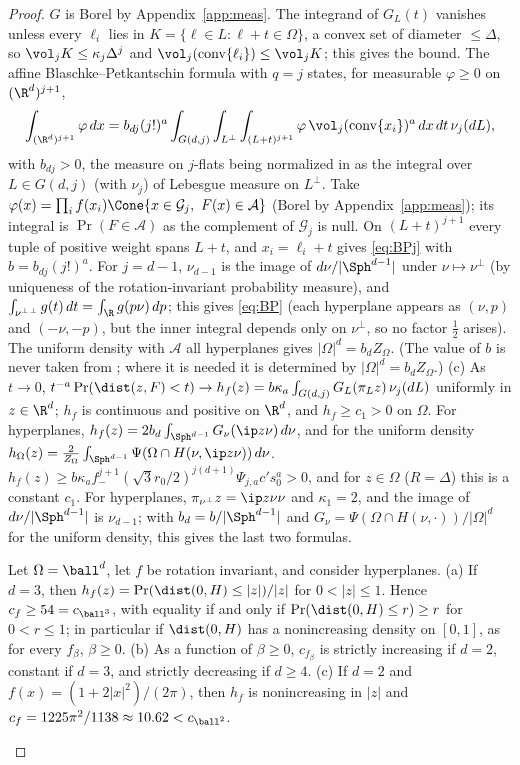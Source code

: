 \begin{proof}
$G$ is Borel by Appendix~\ref{app:meas}. The
integrand of $G_L(t)$ vanishes unless every $\ell_i$ lies in $K=\{\ell\in L:\ell+t\in\Omega\}$, a convex set of diameter $\le\Delta$, so
$\vol_jK\le\kappa_j\Delta^j$ and $\vol_j(\operatorname{conv}\{\ell_i\})\le\vol_jK$; this gives the bound. The affine Blaschke--Petkantschin
formula \cite[Theorem~7.2.7]{SW} with $q=j$ states, for measurable $\varphi\ge0$ on $(\R^d)^{j+1}$,
\[
  \int_{(\R^d)^{j+1}}\varphi\,dx=b_{dj}(j!)^a\int_{G(d,j)}\int_{L^\perp}\int_{(L+t)^{j+1}}\varphi\,\vol_j(\operatorname{conv}\{x_i\})^a\,dx\,dt\,\nu_j(dL),
\]
with $b_{dj}>0$, the measure on $j$-flats being normalized in \cite{SW} as the integral over $L\in G(d,j)$ (with $\nu_j$) of
Lebesgue measure on $L^\perp$. Take $\varphi(x)=\prod_if(x_i)\Cone\{x\in\mathcal G_j,\ F(x)\in\mathcal A\}$ (Borel by Appendix~\ref{app:meas}); its integral is $\Pr(F\in\mathcal A)$ as the complement of $\mathcal G_j$
is null. On $(L+t)^{j+1}$ every tuple of positive weight spans $L+t$, and $x_i=\ell_i+t$ gives \eqref{eq:BPj} with $b=b_{dj}(j!)^a$.
For $j=d-1$, $\nu_{d-1}$ is the image of $d\nu/|\Sph^{d-1}|$ under $\nu\mapsto\nu^\perp$ (by uniqueness of the rotation-invariant
probability measure), and $\int_{\nu^\perp{}^\perp}g(t)\,dt=\int_\R g(p\nu)\,dp$; this gives \eqref{eq:BP} (each hyperplane appears as
$(\nu,p)$ and $(-\nu,-p)$, but the inner integral depends only on $\nu^\perp$, so no factor $\frac12$ arises). The uniform density
with $\mathcal A$ all hyperplanes gives $|\Omega|^d=b_dZ_\Omega$. (The value of $b$ is never taken from \cite{SW}; where it is needed
it is determined by $|\Omega|^d=b_dZ_\Omega$.)
(c) As $t\to0$, $t^{-a}\Pr(\dist(z,F)<t)\to h_f(z)=b\kappa_a\int_{G(d,j)}G_L(\pi_Lz)\,\nu_j(dL)$ uniformly in $z\in\R^d$; $h_f$ is
continuous and positive on $\R^d$, and $h_f\ge c_1>0$ on $\Omega$. For hyperplanes, $h_f(z)=2b_d\int_{\Sph^{d-1}}G_\nu(\ip z\nu)\,d\nu$, and
for the uniform density $h_\Omega(z)=\frac2{Z_\Omega}\int_{\Sph^{d-1}}\Psi(\Omega\cap H(\nu,\ip z\nu))\,d\nu$.
$h_f(z)\ge b\kappa_af_-^{j+1}(\sqrt3r_0/2)^{j(d+1)}\Psi_{j,a}c's_0^a>0$, and for $z\in\Omega$ ($R=\Delta$) this is a constant $c_1$. For
hyperplanes, $\pi_{\nu^\perp}z=\ip z\nu\nu$ and $\kappa_1=2$, and the image of $d\nu/|\Sph^{d-1}|$ is $\nu_{d-1}$; with $b_d=b/|\Sph^{d-1}|$ and
$G_\nu=\Psi(\Omega\cap H(\nu,\cdot))/|\Omega|^d$ for the uniform density, this gives the last two formulas.

\begin{proposition}\label{prop:radial}
Let $\Omega=\ball^d$, let $f$ be rotation invariant, and consider hyperplanes.
(a) If $d=3$, then $h_f(z)=\Pr(\dist(0,H)\le|z|)/|z|$ for $0<|z|\le1$. Hence $c_f\ge54=c_{\ball^3}$, with equality if and only
if $\Pr(\dist(0,H)\le r)\ge r$ for $0<r\le1$; in particular if $\dist(0,H)$ has a nonincreasing density on $[0,1]$, as for every
$f_\beta$, $\beta\ge0$.
(b) As a function of $\beta\ge0$, $c_{f_\beta}$ is strictly increasing if $d=2$, constant if $d=3$, and strictly decreasing if
$d\ge4$.
(c) If $d=2$ and $f(x)=(1+2|x|^2)/(2\pi)$, then $h_f$ is nonincreasing in $|z|$ and $c_f=1225\pi^2/1138\approx10.62<c_{\ball^2}$.


\end{proposition}
\end{proof}
